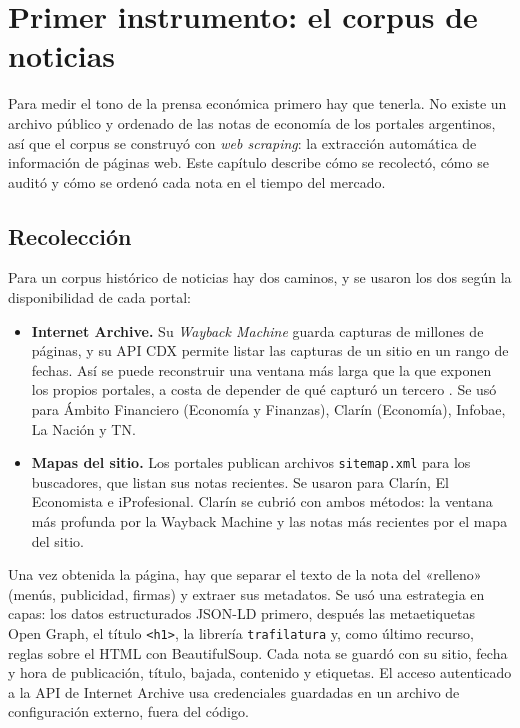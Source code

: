 \chapter{Primer instrumento: el corpus de noticias}
\label{cap:corpus}

Para medir el tono de la prensa económica primero hay que tenerla. No existe un archivo
público y ordenado de las notas de economía de los portales argentinos, así que el corpus se
construyó con \textit{web scraping}: la extracción automática de información de páginas web.
Este capítulo describe cómo se recolectó, cómo se auditó y cómo se ordenó cada nota en el
tiempo del mercado.

\section{Recolección}
\label{sec:recoleccion}

Para un corpus histórico de noticias hay dos caminos, y se usaron los dos según la
disponibilidad de cada portal:

\begin{itemize}
  \item \textbf{Internet Archive.} Su \textit{Wayback Machine} guarda capturas de millones de
        páginas, y su API CDX permite listar las capturas de un sitio en un rango de fechas.
        Así se puede reconstruir una ventana más larga que la que exponen los propios portales,
        a costa de depender de qué capturó un tercero \citep{garg2025wayback}. Se usó para
        Ámbito Financiero (Economía y Finanzas), Clarín (Economía), Infobae, La Nación y TN.
  \item \textbf{Mapas del sitio.} Los portales publican archivos \texttt{sitemap.xml} para los
        buscadores, que listan sus notas recientes. Se usaron para Clarín, El Economista e
        iProfesional. Clarín se cubrió con ambos métodos: la ventana más profunda por la
        Wayback Machine y las notas más recientes por el mapa del sitio.
\end{itemize}

Una vez obtenida la página, hay que separar el texto de la nota del «relleno» (menús,
publicidad, firmas) y extraer sus metadatos. Se usó una estrategia en capas: los datos
estructurados JSON-LD primero, después las metaetiquetas Open Graph, el título
\texttt{<h1>}, la librería \texttt{trafilatura} \citep{barbaresi2021} y, como último recurso,
reglas sobre el HTML con BeautifulSoup. Cada nota se guardó con su sitio, fecha y hora de
publicación, título, bajada, contenido y etiquetas. El acceso autenticado a la API de Internet
Archive usa credenciales guardadas en un archivo de configuración externo, fuera del código.

